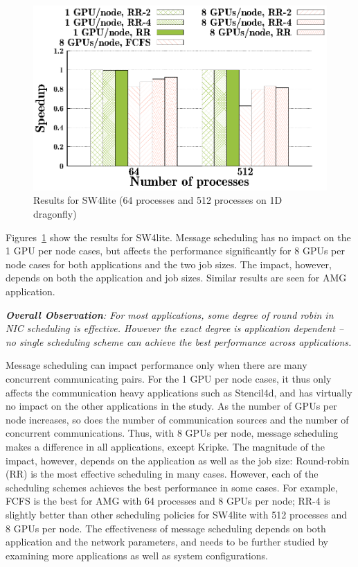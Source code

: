 \begin{figure}[!htbp]
  \centering
  \includegraphics[width=0.8\columnwidth]{figure/plots/sched/dfly-sched-mapping-sw4lite.eps}
  \vspace{-0.5in}
  \caption{Results for SW4lite (64 processes and 512 processes on 1D dragonfly)}
  \label{fig:sw4lite_scheduling_dfly}
\end{figure}


Figures~\ref{fig:sw4lite_scheduling_dfly} show the
results for SW4lite. Message scheduling has no impact on the 1 GPU per node cases, but
affects the performance significantly for 8 GPUs per node cases for both applications and the two
job sizes. The impact, however, depends on both the application and job sizes.
Similar results are seen for AMG application.

\vspace{1em}
\noindent
{\it \textbf{Overall Observation}:
For most applications, some degree of round robin in NIC scheduling is effective. However
    the exact degree is application dependent -- no single scheduling scheme can achieve the best
  performance across applications.}

Message scheduling can impact performance only when there are many concurrent
communicating pairs. For the 1 GPU per node cases, it thus only affects the
communication heavy applications such as Stencil4d, and has virtually no impact
on the other applications in the study. As the number of GPUs per node
increases, so does the  number of communication sources and the number of
concurrent communications. Thus, with 8 GPUs per node, message scheduling makes
a difference in all applications, except Kripke.  The magnitude of the impact,
however, depends on the application as well as the job size: Round-robin (RR) is
the most effective scheduling in many cases.  However, each of the scheduling
schemes achieves the best performance in some cases.
For example, FCFS is the best for AMG with 64 processes and 8 GPUs per node;
RR-4 is slightly better than other scheduling policies for SW4lite with 512
processes and 8 GPUs per node.  The effectiveness of message
scheduling depends on both application and the network parameters, and needs to
be further studied by examining more applications as well as system
configurations. 



